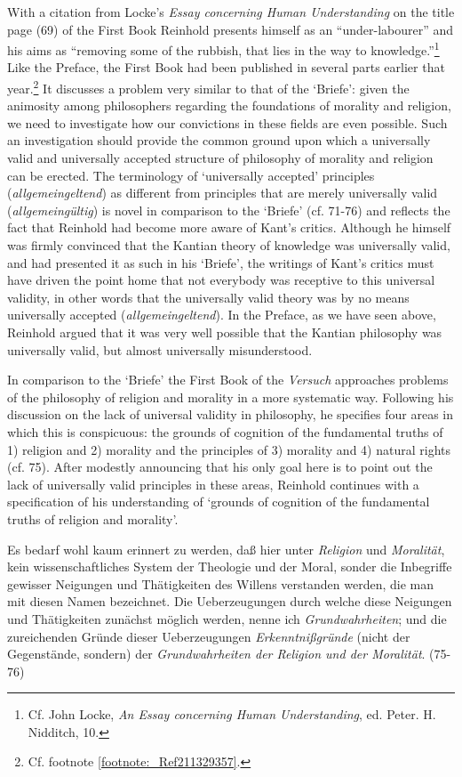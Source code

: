 With a citation from Locke's \textit{Essay concerning Human Understanding }on the title page (69) of the First Book Reinhold presents himself as an ``under{-}labourer'' and his aims as ``removing some of the rubbish, that lies in the way to knowledge.''\footnote{ Cf. John Locke, \textit{An Essay concerning Human Understanding}, ed. Peter. H. Nidditch, 10. } Like the Preface, the First Book had been published in several parts earlier that year.\footnote{ Cf. footnote \ref{footnote:_Ref211329357}.} It discusses a problem very similar to that of the `Briefe': given the animosity among philosophers regarding the foundations of morality and religion, we need to investigate how our convictions in these fields are even possible. Such an investigation should provide the common ground upon which a universally valid and universally accepted structure of philosophy of morality and religion can be erected. The terminology of `universally accepted' principles (\textit{allgemeingeltend}) as different from principles that are merely universally valid (\textit{allgemeing\"{u}ltig}) is novel in comparison to the `Briefe' (cf. 71{-}76) and reflects the fact that Reinhold had become more aware of Kant's critics. Although he himself was firmly convinced that the Kantian theory of knowledge was universally valid, and had presented it as such in his `Briefe', the writings of Kant's critics must have driven the point home that not everybody was receptive to this universal validity, in other words that the universally valid theory was by no means universally accepted (\textit{allgemeingeltend}). In the Preface, as we have seen above, Reinhold argued that it was very well possible that the Kantian philosophy was universally valid, but almost universally misunderstood. 

 In comparison to the `Briefe' the First Book of the \textit{Versuch }approaches problems of the philosophy of religion and morality in a more systematic way. Following his discussion on the lack of universal validity in philosophy, he specifies four areas in which this is conspicuous: the grounds of cognition of the fundamental truths of 1) religion and 2) morality and the principles of 3) morality and 4) natural rights (cf. 75). After modestly announcing that his only goal here is to point out the lack of universally valid principles in these areas, Reinhold continues with a specification of his understanding of `grounds of cognition of the fundamental truths of religion and morality'. 

Es bedarf wohl kaum erinnert zu werden, da\ss{} hier unter \textit{Religion }und \textit{Moralit\"{a}t}, kein wissenschaftliches System der Theologie und der Moral, sonder die Inbegriffe gewisser Neigungen und Th\"{a}tigkeiten des Willens verstanden werden, die man mit diesen Namen bezeichnet. Die Ueberzeugungen durch welche diese Neigungen und Th\"{a}tigkeiten zun\"{a}chst m\"{o}glich werden, nenne ich \textit{Grundwahrheiten}; und die zureichenden Gr\"{u}nde dieser Ueberzeugungen \textit{Erkenntni\ss{}gr\"{u}nde} (nicht der Gegenst\"{a}nde, sondern) der \textit{Grundwahrheiten der Religion und der Moralit\"{a}t}. (75{-}76)

